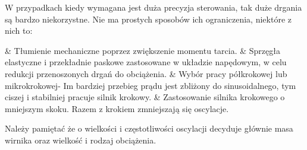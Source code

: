 W przypadkach kiedy wymagana jest duża precyzja sterowania, tak duże drgania są bardzo niekorzystne. Nie ma prostych sposobów ich ograniczenia, niektóre z nich to:

\begin{easylist}
	& Tłumienie mechaniczne poprzez zwiększenie momentu tarcia.
	& Sprzęgła elastyczne i przekładnie paskowe zastosowane w układzie napędowym, w celu redukcji przenoszonych drgań do obciążenia.
	& Wybór pracy półkrokowej lub mikrokrokowej- Im bardziej przebieg prądu jest zbliżony do sinusoidalnego, tym ciszej i stabilniej pracuje silnik krokowy.
	& Zastosowanie silnika krokowego o mniejszym skoku. Razem z krokiem zmniejszają się oscylacje.
	\\
\end{easylist} 

Należy pamiętać że o wielkości i częstotliwości oscylacji decyduje głównie masa wirnika oraz wielkość i rodzaj obciążenia.


\clearpage

